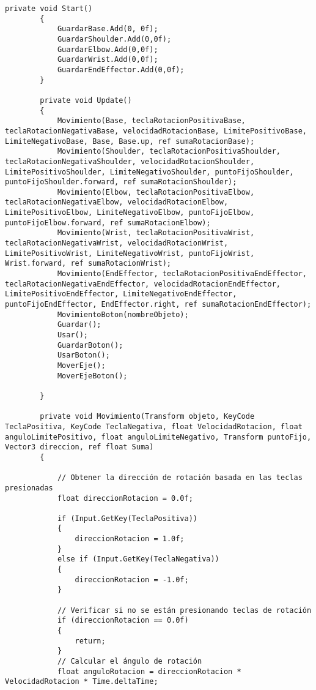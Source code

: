 \begin{lstlisting}[frame=single]
        private void Start()
        {
            GuardarBase.Add(0, 0f);
            GuardarShoulder.Add(0,0f);
            GuardarElbow.Add(0,0f);
            GuardarWrist.Add(0,0f);
            GuardarEndEffector.Add(0,0f);
        }
    
        private void Update()
        {
            Movimiento(Base, teclaRotacionPositivaBase, teclaRotacionNegativaBase, velocidadRotacionBase, LimitePositivoBase, LimiteNegativoBase, Base, Base.up, ref sumaRotacionBase);
            Movimiento(Shoulder, teclaRotacionPositivaShoulder, teclaRotacionNegativaShoulder, velocidadRotacionShoulder, LimitePositivoShoulder, LimiteNegativoShoulder, puntoFijoShoulder, puntoFijoShoulder.forward, ref sumaRotacionShoulder);
            Movimiento(Elbow, teclaRotacionPositivaElbow, teclaRotacionNegativaElbow, velocidadRotacionElbow, LimitePositivoElbow, LimiteNegativoElbow, puntoFijoElbow, puntoFijoElbow.forward, ref sumaRotacionElbow);
            Movimiento(Wrist, teclaRotacionPositivaWrist, teclaRotacionNegativaWrist, velocidadRotacionWrist, LimitePositivoWrist, LimiteNegativoWrist, puntoFijoWrist, Wrist.forward, ref sumaRotacionWrist);
            Movimiento(EndEffector, teclaRotacionPositivaEndEffector, teclaRotacionNegativaEndEffector, velocidadRotacionEndEffector, LimitePositivoEndEffector, LimiteNegativoEndEffector, puntoFijoEndEffector, EndEffector.right, ref sumaRotacionEndEffector);
            MovimientoBoton(nombreObjeto);
            Guardar();
            Usar();
            GuardarBoton();
            UsarBoton();
            MoverEje();
            MoverEjeBoton();
            
        }
     
        private void Movimiento(Transform objeto, KeyCode TeclaPositiva, KeyCode TeclaNegativa, float VelocidadRotacion, float anguloLimitePositivo, float anguloLimiteNegativo, Transform puntoFijo, Vector3 direccion, ref float Suma)
        {
            
            // Obtener la dirección de rotación basada en las teclas presionadas
            float direccionRotacion = 0.0f;
    
            if (Input.GetKey(TeclaPositiva))
            {
                direccionRotacion = 1.0f;
            }
            else if (Input.GetKey(TeclaNegativa))
            {
                direccionRotacion = -1.0f;
            }
    
            // Verificar si no se están presionando teclas de rotación
            if (direccionRotacion == 0.0f)
            {
                return;
            }
            // Calcular el ángulo de rotación
            float anguloRotacion = direccionRotacion * VelocidadRotacion * Time.deltaTime;
            

\end{lstlisting}
